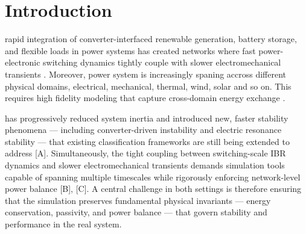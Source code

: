 \documentclass[lettersize,journal]{IEEEtran}
\begin{document}
\section{Introduction}
 rapid integration of converter-interfaced renewable generation, battery storage, and flexible loads in power systems has created networks where fast power-electronic switching dynamics tightly couple with slower electromechanical transients \cite{10273433}. Moreover, power system is increasingly spaning accross different physical domains, electrical, mechanical, thermal, wind, solar and so on. This requires high fidelity modeling that capture cross-domain energy exchange \cite{van2020port}.

has progressively reduced system inertia and introduced new, faster stability phenomena — including converter-driven instability and electric resonance stability — that existing classification frameworks are still being extended to address [A]. Simultaneously, the tight coupling between switching-scale IBR dynamics and slower electromechanical transients demands simulation tools capable of spanning multiple timescales while rigorously enforcing network-level power balance [B], [C]. A central challenge in both settings is therefore ensuring that the simulation preserves fundamental physical invariants — energy conservation, passivity, and power balance — that govern stability and performance in the real system.

\printbibliography
\end{document}
